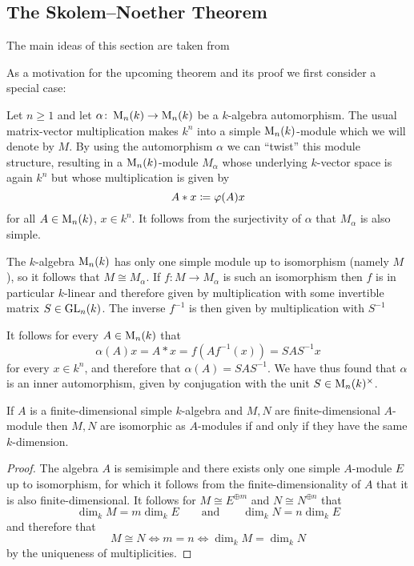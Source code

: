 \subsection{The Skolem--Noether Theorem}


\begin{fluff}
  The main ideas of this section are taken from \cite[4.3]{Clark2012NonCA}
\end{fluff}


\begin{example}
  \label{example: every automorphism of matrix ring is inner}
  As a motivation for the upcoming theorem and its proof we first consider a special case:
  
  Let $n \geq 1$ and let $\alpha \colon \operatorname{M}_n(k) \to \operatorname{M}_n(k)$ be a $k$-algebra automorphism.
  The usual matrix-vector multiplication makes $k^n$ into a simple $\operatorname{M}_n(k)$-module which we will denote by $M$.
  By using the automorphism $\alpha$ we can \enquote{twist} this module structure, resulting in a $\operatorname{M}_n(k)$-module $M_\alpha$ whose underlying $k$-vector space is again $k^n$ but whose multiplication is given by
  \[
              A * x
    \coloneqq  \varphi(A) x
  \]
  for all $A \in \operatorname{M}_n(k)$, $x \in k^n$.
  It follows from the surjectivity of $\alpha$ that $M_\alpha$ is also simple.
  
  The $k$-algebra $\operatorname{M}_n(k)$ has only one simple module up to isomorphism (namely $M$), so it follows that $M \cong M_\alpha$.
  If $f \colon M \to M_\alpha$ is such an isomorphism then $f$ is in particular $k$-linear and therefore given by multiplication with some invertible matrix $S \in \operatorname{GL}_n(k)$.
  The inverse $f^{-1}$ is then given by multiplication with $S^{-1}$
  
  It follows for every $A \in \operatorname{M}_n(k)$ that
  \[
      \alpha(A) x
    = A * x
    = f(A f^{-1}(x))
    = S A S^{-1} x
  \]
  for every $x \in k^n$, and therefore that $\alpha(A) = S A S^{-1}$.
  We have thus found that $\alpha$ is an inner automorphism, given by conjugation with the unit $S \in \operatorname{M}_n(k)^\times$.
\end{example}


\begin{lemma}
  \label{lemma: isomorphic iff same dimension}
  If $A$ is a finite-dimensional simple $k$-algebra and $M, N$ are finite-dimensional $A$-module then $M, N$ are isomorphic as $A$-modules if and only if they have the same $k$-dimension.
\end{lemma}


\begin{proof}
  The algebra $A$ is semisimple and there exists only one simple $A$-module $E$ up to isomorphism, for which it follows from the finite-dimensionality of $A$ that it is also finite-dimensional.
  It follows for $M \cong E^{\oplus m}$ and $N \cong N^{\oplus n}$ that
  \[
    \dim_k M = m \dim_k E
    \qquad\text{and}\qquad
    \dim_k N = n \dim_k E
  \]
  and therefore that
  \[
          M \cong N
    \iff  m = n
    \iff  \dim_k M = \dim_k N
  \]
  by the uniqueness of multiplicities.
\end{proof}


